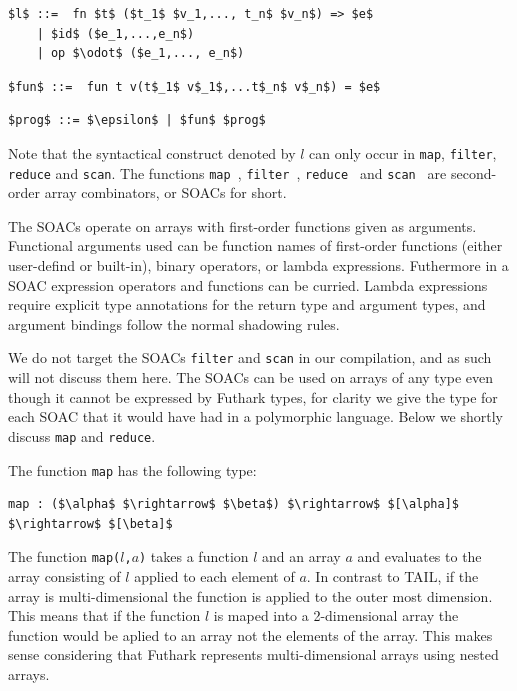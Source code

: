 \documentclass[11pt]{article}
\begin{document}
\begin{lstlisting}[numbers=none,frame=none]
$l$ ::=  fn $t$ ($t_1$ $v_1,..., t_n$ $v_n$) => $e$
    | $id$ ($e_1,...,e_n$)
    | op $\odot$ ($e_1,..., e_n$)
\end{lstlisting}

\begin{lstlisting}[numbers=none,frame=none]
$fun$ ::=  fun t v(t$_1$ v$_1$,...t$_n$ v$_n$) = $e$
\end{lstlisting}

\begin{lstlisting}[numbers=none,frame=none]
$prog$ ::= $\epsilon$ | $fun$ $prog$
\end{lstlisting}

Note that the syntactical construct denoted by $l$ can only occur in {\tt map}, {\tt filter}, {\tt reduce} and {\tt scan}.
The functions {\tt map }, {\tt filter }, {\tt reduce } and {\tt scan } are second-order array combinators, or SOACs for short.

The SOACs operate on arrays with first-order functions given as arguments.
Functional arguments used can be function names of first-order functions (either user-defind or built-in), 
binary operators, or lambda expressions.
Futhermore in a SOAC expression operators and functions can be curried. Lambda expressions require explicit type annotations for
the return type and argument types, and argument bindings follow the normal shadowing rules.

We do not target the SOACs {\tt filter} and {\tt scan} in our compilation, and as such will not discuss them here.
The SOACs can be used on arrays of any type even though it cannot be expressed by Futhark types, for clarity we give the type for each SOAC that it would have had in a polymorphic language.
Below we shortly discuss {\tt map} and {\tt reduce}.


The function {\tt map} has the following type: 
\begin{lstlisting}[numbers=none,frame=none]
map : ($\alpha$ $\rightarrow$ $\beta$) $\rightarrow$ $[\alpha]$ $\rightarrow$ $[\beta]$
\end{lstlisting}
The function {\tt map($l$,$a$)} takes a function $l$ and an array $a$ and evaluates to the array consisting of $l$ applied to each element of $a$.
In contrast to TAIL, if the array is multi-dimensional the function is applied to the outer most dimension.
This means that if the function $l$ is maped into a 2-dimensional array the function would be aplied to an array not the elements
of the array. This makes sense considering that Futhark represents multi-dimensional arrays using nested arrays.\\
\end{document}
